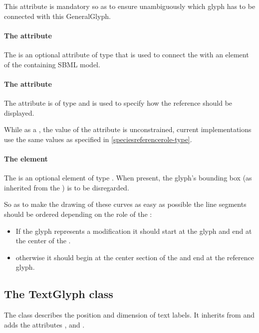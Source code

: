 This attribute is mandatory so as to ensure unambiguously which glyph has to be 
connected with this GeneralGlyph. 


\paragraph{The  attribute}
The  is an optional attribute of type  
that is used to connect the \ReferenceGlyph with an element of the 
containing SBML model. 

\paragraph{The  attribute}
The  attribute is of type  and is used to 
specify how the reference should be displayed. 

While as a , the value of the  attribute is 
unconstrained, current implementations use the same values as specified 
in \ref{speciesreferencerole-type}. 


\paragraph{The  element}
The  is an optional element of type \Curve. When present, 
the glyph's bounding box (as inherited from the \GraphicalObject) is to 
be disregarded. 

So as to make the drawing of these curves as easy as possible the line 
segments should be ordered depending on the role of the \ReferenceGlyph:

\begin{itemize}
	\item If the glyph represents a modification it should start at the glyph and end at the center of the \GeneralGlyph.
	\item otherwise it should begin at the center section of the \GeneralGlyph and end at the reference glyph. 
\end{itemize}


\subsection{The TextGlyph class}
\label{textglyph-class}
The \TextGlyph class describes the position and dimension of text 
labels. It inherits from \GraphicalObject and adds the attributes 
,  and . 



